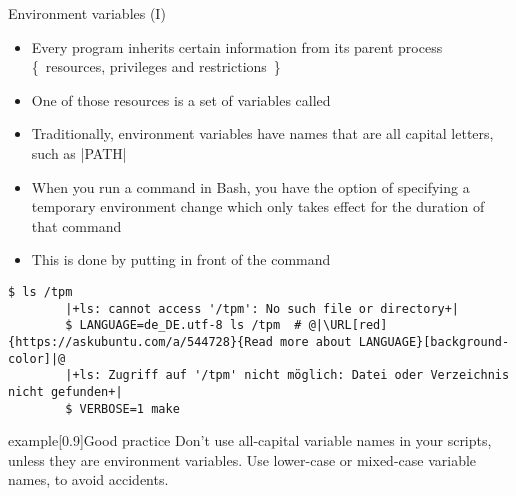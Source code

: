 \begin{frame}[fragile]{Environment variables (I)}
    \vspace{-3mm}
    \begin{itemize}
        \item Every program inherits certain information from its parent process {\tiny\{~resources, privileges and restrictions~\}}
        \item One of those resources is a set of variables called 
        \item Traditionally, environment variables have names that are all capital letters, such as \bash|PATH|
        \item When you run a command in Bash, you have the option of specifying a temporary environment change which only takes effect for the duration of that command
        \item This is done by putting  in front of the command
    \end{itemize}
    \begin{lstlisting}[style=MyBash]
        $ ls /tpm
        |+ls: cannot access '/tpm': No such file or directory+|
        $ LANGUAGE=de_DE.utf-8 ls /tpm  # @|\URL[red]{https://askubuntu.com/a/544728}{Read more about LANGUAGE}[background-color]|@
        |+ls: Zugriff auf '/tpm' nicht möglich: Datei oder Verzeichnis nicht gefunden+|
        $ VERBOSE=1 make
    \end{lstlisting}
    \begin{varblock}{example}[0.9\textwidth]{Good practice}
        Don't use all-capital variable names in your scripts, unless they are environment variables.
        Use lower-case or mixed-case variable names, to avoid accidents.
    \end{varblock}
\end{frame}

